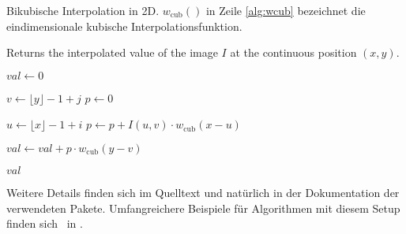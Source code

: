\begin{algorithm}[tbp]
\caption{Bikubische Interpolation in 2D.
	$w_{\mathrm{cub}}()$ in Zeile \ref{alg:wcub} bezeichnet die 
	eindimensionale kubische Interpolationsfunktion.}
\label{alg:Example}

\begin{algorithmic}[1]     %
 
	\Statex Returns the interpolated value of the image $I$ 
					at the continuous position $(x, y)$.
	
	\State $\mathit{val} \gets 0$
	
	 
		\State $v \gets \lfloor y \rfloor - 1 + j$
		\State $p \gets 0$
		
		 
			\State $u \gets \lfloor x \rfloor - 1 + i$
			\State $p \gets p + I(u,v) \cdot w_{\mathrm{cub}}(x - u )$
					\label{alg:wcub}
		\EndFor
		
		\State $\mathit{val} \gets \mathit{val} + p \cdot w_{\mathrm{cub}}(y - v)$
	\EndFor
	
	\State\Return $\mathit{val}$
	
\EndProcedure
\end{algorithmic}
\end{algorithm}


Weitere Details finden sich im Quelltext und natürlich in der Dokumentation der verwendeten Pakete.
Umfangreichere Beispiele für Algorithmen mit diesem Setup finden sich \ua\ in \cite{BurgerBurge2006}.

